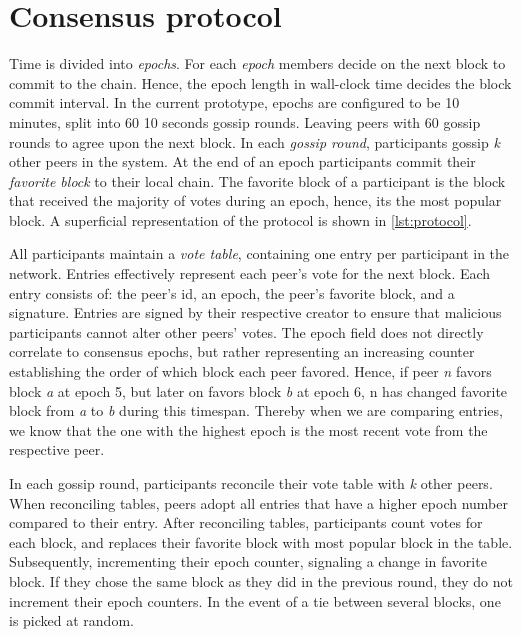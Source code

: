 \documentclass[USenglish]{uit-thesis}
\begin{document}
\section{Consensus protocol}
Time is divided into \textit{epochs}. 
For each \textit{epoch} members decide on the next block to commit to the chain. 
Hence, the epoch length in wall-clock time decides the block commit interval.
In the current prototype, epochs are configured to be 10 minutes, split into 60 10 seconds gossip rounds. 
Leaving peers with 60 gossip rounds to agree upon the next block.
In each \textit{gossip round}, participants gossip \textit{k} other peers in the system.
At the end of an epoch participants commit their \textit{favorite block} to their local chain.
The favorite block of a participant is the block that received the majority of votes during an epoch, hence, its the most popular block.
A superficial representation of the protocol is shown in \autoref{lst:protocol}.

\begin{code}[H]
\end{code} 



All participants maintain a \textit{vote table}, containing one entry per participant in the network.
Entries effectively represent each peer's vote for the next block.
Each entry consists of: the peer's id, an epoch, the peer's favorite block, and a signature. 
Entries are signed by their respective creator to ensure that malicious participants cannot alter other peers' votes.
The epoch field does not directly correlate to consensus epochs, but rather representing an increasing counter establishing the order of which block each peer favored.
Hence, if peer \textit{n} favors block \textit{a} at epoch 5, but later on favors block \textit{b} at epoch 6, n has changed favorite block from \textit{a} to \textit{b} during this timespan.
Thereby when we are comparing entries, we know that the one with the highest epoch is the most recent vote from the respective peer.



In each gossip round, participants reconcile their vote table with \textit{k} other peers.
When reconciling tables, peers adopt all entries that have a higher epoch number compared to their entry. 
After reconciling tables, participants count votes for each block, and replaces their favorite block with most popular block in the table.
Subsequently, incrementing their epoch counter, signaling a change in favorite block.
If they chose the same block as they did in the previous round, they do not increment their epoch counters. 
In the event of a tie between several blocks, one is picked at random.
\end{document}
